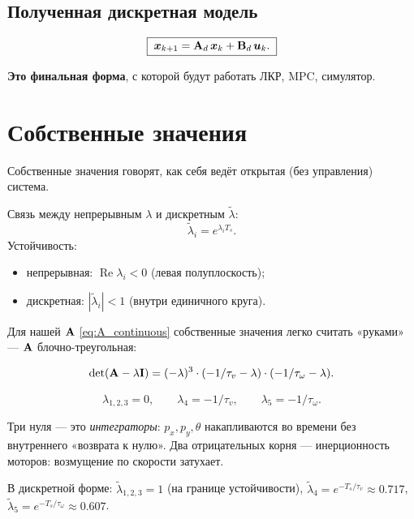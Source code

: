 \subsection{Полученная дискретная модель}

\begin{formulabox}[title={Дискретная модель робота}]
\begin{equation}
  \boxed{\;\bm{x}_{k+1} = \mathbf{A}_d\,\bm{x}_k + \mathbf{B}_d\,\bm{u}_k.\;}
  \label{eq:discrete_model}
\end{equation}
\end{formulabox}

\textbf{Это финальная форма}, с которой будут работать ЛКР, MPC, симулятор.

\section{Собственные значения}

Собственные значения говорят, как себя ведёт открытая (без управления)
система.

\begin{notebox}
Связь между непрерывным $\lambda$ и дискретным $\tilde{\lambda}$:
\[
  \tilde{\lambda}_i = e^{\lambda_i T_s}.
\]
Устойчивость:
\begin{itemize}
  \item непрерывная: $\operatorname{Re}\lambda_i < 0$ (левая полуплоскость);
  \item дискретная: $|\tilde{\lambda}_i| < 1$ (внутри единичного круга).
\end{itemize}
\end{notebox}

Для нашей $\mathbf{A}$ \eqref{eq:A_continuous} собственные значения легко
считать «руками» --- $\mathbf{A}$ блочно-треугольная:

\[
  \det(\mathbf{A} - \lambda \mathbf{I}) =
  (-\lambda)^3 \cdot (-1/\tau_v - \lambda) \cdot (-1/\tau_\omega - \lambda).
\]

\begin{equation}
  \lambda_{1,2,3} = 0,
  \qquad
  \lambda_4 = -1/\tau_v,
  \qquad
  \lambda_5 = -1/\tau_\omega.
  \label{eq:eigenvalues}
\end{equation}

Три нуля --- это \emph{интеграторы}: $p_x, p_y, \theta$ накапливаются
во времени без внутреннего «возврата к нулю». Два отрицательных корня
--- инерционность моторов: возмущение по скорости затухает.

В дискретной форме: $\tilde\lambda_{1,2,3} = 1$ (на границе устойчивости),
$\tilde\lambda_4 = e^{-T_s/\tau_v} \approx 0.717$,
$\tilde\lambda_5 = e^{-T_s/\tau_\omega} \approx 0.607$.

